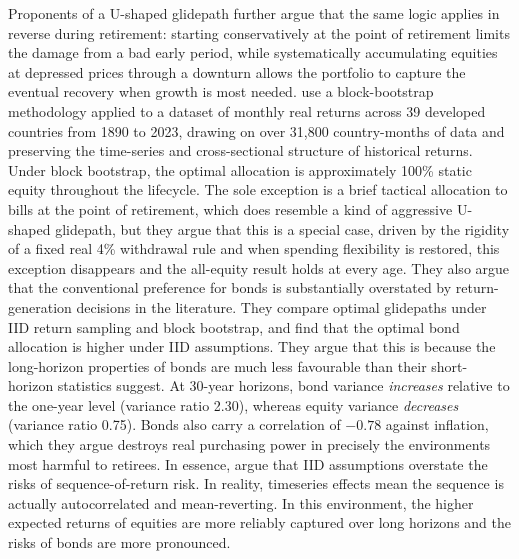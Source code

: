 \documentclass[11pt]{article}
\begin{document}
Proponents of a U-shaped glidepath further argue that the same logic applies in reverse during retirement: starting conservatively at the point of retirement limits the damage from a bad early period, while systematically accumulating equities at depressed prices through a downturn allows the portfolio to capture the eventual recovery when growth is most needed. \textcite{anarkulova2025beyond} use a block-bootstrap methodology applied to a dataset of monthly real returns across 39 developed countries from 1890 to 2023, drawing on over 31,800 country-months of data and preserving the time-series and cross-sectional structure of historical returns. Under block bootstrap, the optimal allocation is approximately 100\% static equity throughout the lifecycle. The sole exception is a brief tactical allocation to bills at the point of retirement, which does resemble a kind of aggressive U-shaped glidepath, but they argue that this is a special case, driven by the rigidity of a fixed real 4\% withdrawal rule \parencite[based on][]{bengen1994withdrawal} and when spending flexibility is restored, this exception disappears and the all-equity result holds at every age. They also argue that the conventional preference for bonds is substantially overstated by return-generation decisions in the literature. They compare optimal glidepaths under IID return sampling and block bootstrap, and find that the optimal bond allocation is higher under IID assumptions. They argue that this is because the long-horizon properties of bonds are much less favourable than their short-horizon statistics suggest. At 30-year horizons, bond variance \textit{increases} relative to the one-year level (variance ratio 2.30), whereas equity variance \textit{decreases} (variance ratio 0.75). Bonds also carry a correlation of $-0.78$ against inflation, which they argue destroys real purchasing power in precisely the environments most harmful to retirees. In essence, \textcite{anarkulova2025beyond} argue that IID assumptions overstate the risks of sequence-of-return risk. In reality, timeseries effects mean the sequence is actually autocorrelated and mean-reverting. In this environment, the higher expected returns of equities are more reliably captured over long horizons and the risks of bonds are more pronounced. 
\end{document}
